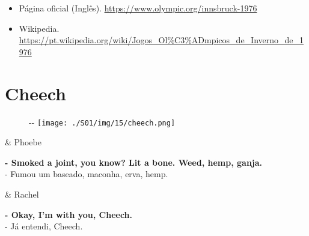 \begin{itemize}
\tightlist
\item
  \sloppy Página oficial (Inglês). \url{https://www.olympic.org/innsbruck-1976}
\item
  \sloppy Wikipedia. \url{https://pt.wikipedia.org/wiki/Jogos_Ol%C3%ADmpicos_de_Inverno_de_1976}
\end{itemize}

\hypertarget{cheech}{%
\section{Cheech}\label{cheech}}

\begin{figure}[!ht]
  \begin{adjustwidth}{-\oddsidemargin-1in}{-\rightmargin}
    \centering
    \texttt{[image: ./S01/img/15/cheech.png]}
  \end{adjustwidth}
\end{figure}

\begin{tcolorbox}[enhanced,center upper,
    drop fuzzy shadow southeast, boxrule=0.3pt,
    lower separated=false, breakable,
    colframe=black!30!dialogoBorder,colback=white]
\begin{minipage}[c]{0.16\linewidth}
   & \centering \scriptsize{Phoebe}
\end{minipage}
\hfill
\begin{minipage}[c]{0.8\linewidth}
  \textbf{- Smoked a joint, you know? Lit a bone. Weed, hemp, ganja.}\\
  - Fumou um baseado, maconha, erva, hemp.
\end{minipage}

\medskip
\begin{minipage}[c]{0.16\linewidth}
   & \centering \scriptsize{Rachel}
\end{minipage}
\hfill
\begin{minipage}[c]{0.8\linewidth}
  \textbf{- Okay, I'm with you, Cheech.}\\
  - Já entendi, Cheech.
\end{minipage}
\end{tcolorbox}

